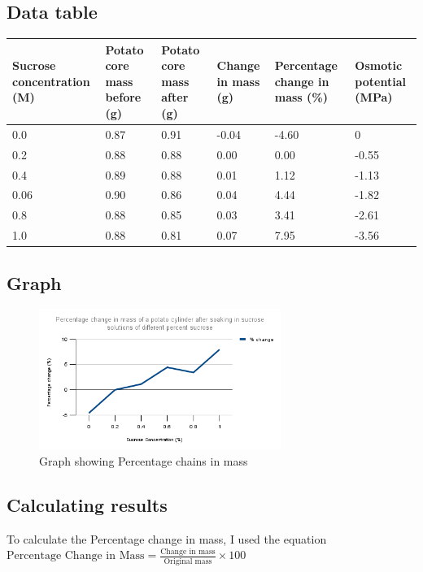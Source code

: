 \documentclass{thomasClass}
\begin{document}
\subsection{Data table}
\begin{table}[H]
\centering
\begin{tabularx}{0.8\textwidth}{X|X|X|X|X|X}
Sucrose concentration (M) & Potato core mass before (g) & Potato core mass after (g) & Change in mass (g) & Percentage change in mass (\%) & Osmotic potential (MPa) \\
\hline
0.0 & 0.87 & 0.91 & -0.04 & -4.60 & 0 \\
0.2 & 0.88 & 0.88 & 0.00 & 0.00 & -0.55 \\
0.4 & 0.89 & 0.88 & 0.01 & 1.12 & -1.13 \\
0.06 & 0.90 & 0.86 & 0.04 & 4.44 & -1.82 \\
0.8 & 0.88 & 0.85 & 0.03 & 3.41 & -2.61 \\
1.0 & 0.88 & 0.81 & 0.07 & 7.95 & -3.56
\end{tabularx}
\end{table}

\subsection{Graph}
\begin{figure} [H]
    \centering
    \includegraphics[width=0.7\textwidth]{RPA3-GRAPH.png}
    \caption{Graph showing Percentage chains in mass}
\end{figure}

\subsection{Calculating results}
To calculate the Percentage change in mass, I used the equation\\ $\mbox{Percentage Change in Mass} = \frac{\mbox{Change in mass}}{\mbox{Original mass}}\times 100$
\end{document}

